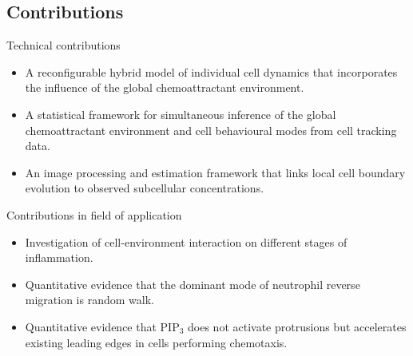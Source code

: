 \documentclass[mathserif,11pt]{beamer}
\begin{document}
\subsection{Contributions}
\begin{frame}{Technical contributions}
\begin{itemize}
	\item A reconfigurable hybrid model of individual cell dynamics that incorporates the influence of the global chemoattractant environment.
	\item A statistical framework for simultaneous inference of the global chemoattractant environment and cell behavioural modes from cell tracking data.
	\item An image processing and estimation framework that links local cell boundary evolution to observed subcellular concentrations.
\end{itemize}
\end{frame}
\begin{frame}{Contributions in field of application}
\begin{itemize}
	\item Investigation of cell-environment interaction on different stages of inflammation.
	\item Quantitative evidence that the dominant mode of neutrophil reverse migration is random walk.
	\item Quantitative evidence that PIP$_3$ does not activate protrusions but accelerates existing leading edges in cells performing chemotaxis.
\end{itemize}
\end{frame}
\end{document}
